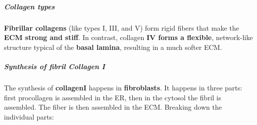 \documentclass[../main.tex]{subfiles}
\begin{document}
\subparagraph{Collagen types}
\begin{figure}[H]
	\centering
\end{figure}
\textbf{Fibrillar collagens} (like types I, III, and V) form rigid fibers that make the \textbf{ECM strong and stiff}. In contrast, collagen \textbf{IV forms a flexible}, network-like structure typical of the \textbf{basal lamina}, resulting in a much softer ECM.

\subparagraph{Synthesis of fibril Collagen I}

The synthesis of \textbf{\gls{collagenI}} happens in \textbf{\gls{fibroblasts}}. It happens in three parts: first \gls{procollagen} is assembled in the ER, then in the cytosol the fibril is assembled. The fiber is then assembled in the ECM. Breaking down the individual parts: \\
\end{document}
